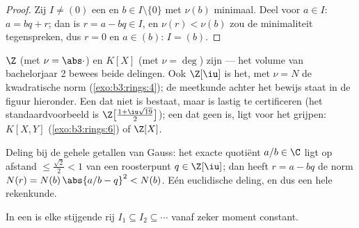 \begin{proof}
Zij $I \neq (0)$ een  en $b \in I \setminus\{0\}$ met
$\nu(b)$ minimaal. Deel voor $a \in I$: $a = bq + r$; dan is $r = a
- bq \in I$, en $\nu(r) < \nu(b)$ zou de minimaliteit
tegenspreken, dus $r = 0$ en $a \in (b)$: $I = (b)$.
\end{proof}

\begin{example}\label{ex:b3:rings:euclidean}
$\Z$ (met $\nu = \abs\cdot$) en $K[X]$ (met $\nu = \deg$) zijn
 --- het volume van bachelorjaar 2 bewees beide delingen.
Ook $\Z[\iu]$ is het, met $\nu = N$ de kwadratische norm
(\cref{exo:b3:rings:4}); de meetkunde achter het bewijs staat in de
figuur hieronder. Een  dat niet  is
bestaat, maar is lastig te certificeren (het standaardvoorbeeld is
$\Z\bigl[\frac{1+\iu\sqrt{19}}2\bigr]$); een  dat geen
 is, ligt voor het grijpen: $K[X, Y]$
(\cref{exo:b3:rings:6}) of $\Z[X]$.
\end{example}

\begin{omfigure}

{\small Deling bij de gehele getallen van Gauss: het exacte
quotiënt $a/b \in \C$ ligt op afstand $\leq \frac{\sqrt2}{2} < 1$
van een roosterpunt $q \in \Z[\iu]$; dan heeft $r = a - bq$ de norm
$N(r) = N(b)\,\abs{a/b - q}^2 < N(b)$. Eén euclidische deling, en
dus een hele rekenkunde.}
\end{omfigure}

\begin{lemma}
\label{lem:b3:rings:acc}
In een  is elke stijgende rij  $I_1
\subseteq I_2 \subseteq \cdots$ vanaf zeker moment constant.
\end{lemma}

